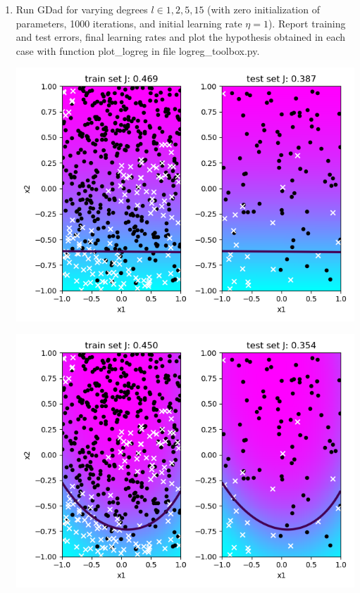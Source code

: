 \documentclass[a4paper]{article}
\begin{document}
\begin{enumerate}
\item Run GDad for varying degrees $l \in {1, 2, 5, 15}$ (with zero initialization of parameters, 1000 iterations, and initial learning rate $\eta = 1$). Report training and test errors, final learning rates and plot the hypothesis obtained in each case with function plot\_logreg in file logreg\_toolbox.py.\\
\begin{minipage}[b]{0.4\textwidth}
  \vspace{10pt}
  \includegraphics[scale=0.35]{plots/ad_gradient_descent_1_1_1000.png}
 \captionsetup{justification=centering}
  \label{ad_gradient_descent_1_1_1000}
\end{minipage}
\hfill
\begin{minipage}[b]{0.4\textwidth}
  \includegraphics[scale=0.35]{plots/ad_gradient_descent_2_1_1000.png}

\end{minipage}
\end{enumerate}
\end{document}
